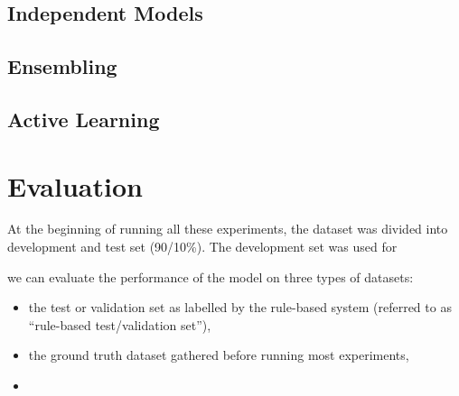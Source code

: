 \subsection{Independent Models}
\label{exp_models}

\subsection{Ensembling}
\label{exp_ensembling}

\subsection{Active Learning}
\label{exp_al}



\section{Evaluation}
\label{evaluation}

At the beginning of running all these experiments, the dataset was divided into development and test set (90/10\%).
The development set was used for


 we can evaluate the performance of the model on three types of datasets:

\begin{itemize}
  \item the test or validation set as labelled by the rule-based system (referred to as ``rule-based test/validation set''),
  \item the ground truth dataset gathered  before running most experiments,
  \item
\end{itemize}
